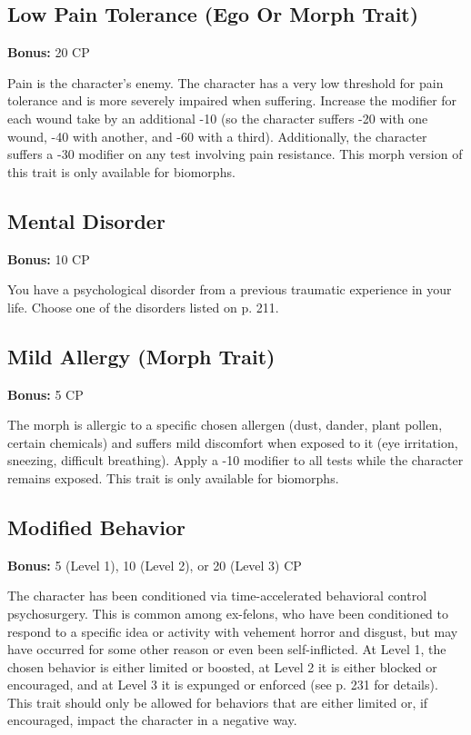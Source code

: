 \subsection{Low Pain Tolerance (Ego Or Morph Trait)}
\label{sec:traits-low-pain-tolerance}

\textbf{Bonus:} 20 CP

Pain is the character’s enemy. The character has a very low threshold for pain tolerance and is more severely impaired when suffering. Increase the modifier for each wound take by an additional -10 (so the character suffers -20 with one wound, -40 with another, and -60 with a third). Additionally, the character suffers a -30 modifier on any test involving pain resistance. This morph version of this trait is only available for biomorphs.

\subsection{Mental Disorder}
\label{sec:traits-mental-disorder}

\textbf{Bonus:} 10 CP

You have a psychological disorder from a previous traumatic experience in your life. Choose one of the disorders listed on p. 211.

\subsection{Mild Allergy (Morph Trait)}
\label{sec:traits-mild-allergy}

\textbf{Bonus:} 5 CP

The morph is allergic to a specific chosen allergen (dust, dander, plant pollen, certain chemicals) and suffers mild discomfort when exposed to it (eye irritation, sneezing, difficult breathing). Apply a -10 modifier to all tests while the character remains exposed. This trait is only available for biomorphs.

\subsection{Modified Behavior}
\label{sec:traits-modified-behaviour}

\textbf{Bonus:} 5 (Level 1), 10 (Level 2), or 20 (Level 3) CP

The character has been conditioned via time-accelerated behavioral control psychosurgery. This is common among ex-felons, who have been conditioned to respond to a specific idea or activity with vehement horror and disgust, but may have occurred for some other reason or even been self-inflicted. At Level 1, the chosen behavior is either limited or boosted, at Level 2 it is either blocked or encouraged, and at Level 3 it is expunged or enforced (see p. 231 for details). This trait should only be allowed for behaviors that are either limited or, if encouraged, impact the character in a negative way.

